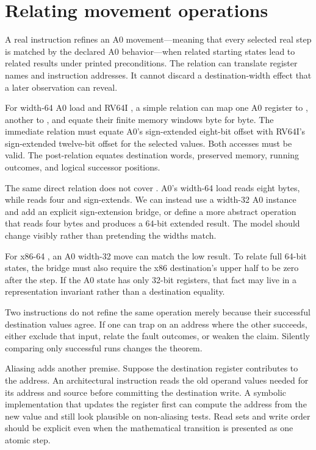 \section{Relating movement operations}

A real instruction refines an A0 movement---meaning that every selected real
step is matched by the declared A0 behavior---when related starting states
lead to related results under printed preconditions. The relation can translate
register names and instruction addresses. It cannot discard a destination-width
effect that a later observation can reveal.

For width-64 A0 load and RV64I , a simple relation can map one A0
register to , another to , and equate their finite memory
windows byte for byte. The immediate relation must equate A0's sign-extended
eight-bit offset with RV64I's sign-extended twelve-bit offset for the selected
values. Both accesses must be valid. The post-relation equates destination
words, preserved memory, running outcomes, and logical successor positions.

The same direct relation does not cover . A0's width-64 load reads
eight bytes, while  reads four and sign-extends. We can instead use
a width-32 A0 instance and add an explicit sign-extension bridge, or define a
more abstract operation that reads four bytes and produces a 64-bit extended
result. The model should change visibly rather than pretending the widths match.

For x86-64 , an A0 width-32 move can match the low result.
To relate full 64-bit states, the bridge must also require the x86 destination's
upper half to be zero after the step. If the A0 state has only 32-bit registers,
that fact may live in a representation invariant rather than a destination
equality.

\begin{warning}[title={Fault agreement is part of movement refinement}]
Two instructions do not refine the same operation merely because their
successful destination values agree. If one can trap on an address where the
other succeeds, either exclude that input, relate the fault outcomes, or weaken
the claim. Silently comparing only successful runs changes the theorem.
\end{warning}

Aliasing adds another premise. Suppose the destination register contributes to
the address. An architectural instruction reads the old operand values needed
for its address and source before committing the destination write. A symbolic
implementation that updates the register first can compute the address from
the new value and still look plausible on non-aliasing tests. Read sets and
write order should be explicit even when the mathematical transition is
presented as one atomic step.

